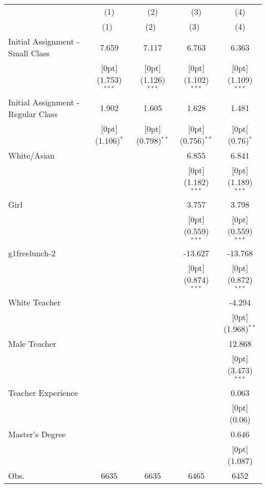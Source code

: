 \begin{tabular*}{\textwidth}{@{\extracolsep{\fill}}lcccc}				
	& \multicolumn{1}{c}{(1)} &	\multicolumn{1}{c}{(2)} &	\multicolumn{1}{c}{(3)} &	\multicolumn{1}{c}{(4)} \\
\cline{2-5}				
	& \multicolumn{1}{c}{(1)\mbox{\ }} &	\multicolumn{1}{c}{(2)\mbox{\ }} &	\multicolumn{1}{c}{(3)\mbox{\ }} &	\multicolumn{1}{c}{(4)} \\
\hline				
Initial Assignment - Small Class &	7.659 &	7.117 &	6.763 &	6.363 \\
&	\raisebox{.7ex}[0pt]{\scriptsize (1.753)$^{***}$} &	\raisebox{.7ex}[0pt]{\scriptsize (1.126)$^{***}$} &	\raisebox{.7ex}[0pt]{\scriptsize (1.102)$^{***}$} &	\raisebox{.7ex}[0pt]{\scriptsize (1.109)$^{***}$} \\
Initial Assignment - Regular Class &	1.902 &	1.605 &	1.628 &	1.481 \\
&	\raisebox{.7ex}[0pt]{\scriptsize (1.106)$^{*}$} &	\raisebox{.7ex}[0pt]{\scriptsize (0.798)$^{**}$} &	\raisebox{.7ex}[0pt]{\scriptsize (0.756)$^{**}$} &	\raisebox{.7ex}[0pt]{\scriptsize (0.76)$^{*}$} \\
White/Asian &	&	&	6.855 &	6.841 \\
&	&	&	\raisebox{.7ex}[0pt]{\scriptsize (1.182)$^{***}$} &	\raisebox{.7ex}[0pt]{\scriptsize (1.189)$^{***}$} \\
Girl &	&	&	3.757 &	3.798 \\
&	&	&	\raisebox{.7ex}[0pt]{\scriptsize (0.559)$^{***}$} &	\raisebox{.7ex}[0pt]{\scriptsize (0.559)$^{***}$} \\
g1freelunch-2 &	&	&	-13.627 &	-13.768 \\
&	&	&	\raisebox{.7ex}[0pt]{\scriptsize (0.874)$^{***}$} &	\raisebox{.7ex}[0pt]{\scriptsize (0.872)$^{***}$} \\
White Teacher &	&	&	&	-4.294 \\
&	&	&	&	\raisebox{.7ex}[0pt]{\scriptsize (1.968)$^{**}$} \\
Male Teacher &	&	&	&	12.868 \\
&	&	&	&	\raisebox{.7ex}[0pt]{\scriptsize (3.473)$^{***}$} \\
Teacher Experience &	&	&	&	0.063 \\
&	&	&	&	\raisebox{.7ex}[0pt]{\scriptsize (0.06)} \\
Master's Degree &	&	&	&	0.646 \\
&	&	&	&	\raisebox{.7ex}[0pt]{\scriptsize (1.087)} \\
Obs. &	6635 &	6635 &	6465 &	6452 \\
\hline\hline				
\end{tabular*}%
